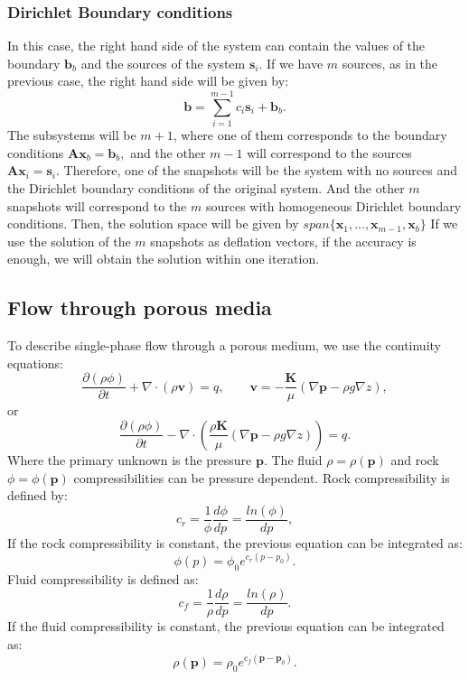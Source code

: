 \documentclass[12pt]{article}
\begin{document}
\subsubsection*{{Dirichlet Boundary conditions}}
In this case, the right hand side of the system can contain the values of the boundary $\mathbf{b}_b$ and the sources of the system $\mathbf{s}_i$. 
If we have $m$ sources, as in the previous case, the right hand side will be given by:
$$\mathbf{b}=\sum_{i=1}^{m-1} {c}_i\mathbf{s}_i+\mathbf{b}_b.$$
The subsystems will be $m+1$, where one of them corresponds to the boundary conditions
 $\mathbf{A}\mathbf{x}_b=\mathbf{b}_b,$
 and the other $m-1$ will correspond to the sources
$\mathbf{A}\mathbf{x}_i=\mathbf{s}_i.$
Therefore, one of the snapshots will be the system with no sources and the Dirichlet boundary conditions of the original system. And the other $m$ snapshots will correspond to the $m$ sources with homogeneous Dirichlet boundary conditions. Then, the solution space will be given by $ span\{\mathbf{x}_1,...,\mathbf{x}_{m-1},\mathbf{x}_b\}$
If we use the solution of the $m$ snapshots as deflation vectors, if the accuracy is enough, we will obtain the solution within one iteration.

\subsection*{Flow through porous media}

\hspace{0.5cm}To describe single-phase flow through a porous medium, we use the continuity equations:
\begin{equation}\label{eq:ce}
\frac{\partial (\rho \phi)}{\partial t}+ \nabla \cdot ( \rho \mathbf{v})=q, \qquad \mathbf{v}=-\frac{\mathbf{K}}{\mu}(\nabla \mathbf{p}-\rho g\nabla z),
\end{equation}
or
\begin{equation}\label{eq:ce1}
\frac{\partial (\rho \phi)}{\partial t}- \nabla \cdot \left( \frac{\rho\mathbf{K}}{\mu}(\nabla \mathbf{p}-\rho g\nabla z)\right)=q.
\end{equation}
Where the primary unknown is the pressure $\mathbf{p}$.  The fluid  $\rho=\rho(\mathbf{p})$ and rock $\phi=\phi(\mathbf{p})$ compressibilities can be pressure dependent.
Rock compressibility is defined by:
\begin{equation*}
 c_r=\frac{1}{\phi}\frac{d\phi}{dp}=\frac{ln(\phi)}{dp},
\end{equation*}
If the rock compressibility is constant, the previous equation can be integrated as:
\begin{equation*}
 \phi(p)=\phi_0 e^{c_r(p-p_0)}.
\end{equation*}
Fluid compressibility is defined as:
\begin{equation}\label{eq:fc}
 c_f=\frac{1}{\rho}\frac{d\rho}{dp}=\frac{ln(\rho)}{dp}.
\end{equation}
If the fluid compressibility is constant, the previous equation can be integrated as:
\begin{equation}\label{eq:rhoeq}
 \rho(\mathbf{p})=\rho_0 e^{c_f(\mathbf{p}-\mathbf{p}_0)}.
\end{equation}
\end{document}
